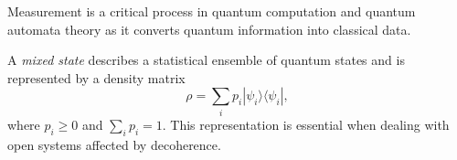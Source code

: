 \begin{observation}
Measurement is a critical process in quantum computation and quantum automata theory as it converts quantum information into classical data.
\end{observation}

\begin{definition}
A \emph{mixed state} describes a statistical ensemble of quantum states and is represented by a density matrix
\[
\rho = \sum_i p_i |\psi_i\rangle \langle\psi_i|,
\]
where \(p_i \ge 0\) and \(\sum_i p_i = 1\). This representation is essential when dealing with open systems affected by decoherence.
\end{definition}